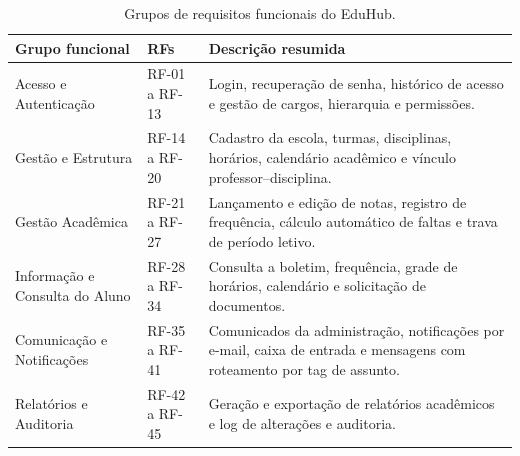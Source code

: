 \begin{table}[ht]
\centering
\caption{Grupos de requisitos funcionais do EduHub.}
\label{tab:rf-resumo}
\begin{tabularx}{\textwidth}{p{} p{} X}
\toprule
\textbf{Grupo funcional} & \textbf{RFs} & \textbf{Descrição resumida} \\
\midrule
Acesso e Autenticação & RF-01 a RF-13 & Login, recuperação de senha, histórico de acesso e gestão de cargos, hierarquia e permissões. \\
Gestão e Estrutura & RF-14 a RF-20 & Cadastro da escola, turmas, disciplinas, horários, calendário acadêmico e vínculo professor--disciplina. \\
Gestão Acadêmica & RF-21 a RF-27 & Lançamento e edição de notas, registro de frequência, cálculo automático de faltas e trava de período letivo. \\
Informação e Consulta do Aluno & RF-28 a RF-34 & Consulta a boletim, frequência, grade de horários, calendário e solicitação de documentos. \\
Comunicação e Notificações & RF-35 a RF-41 & Comunicados da administração, notificações por e-mail, caixa de entrada e mensagens com roteamento por tag de assunto. \\
Relatórios e Auditoria & RF-42 a RF-45 & Geração e exportação de relatórios acadêmicos e log de alterações e auditoria. \\
\bottomrule
\end{tabularx}
\end{table}

